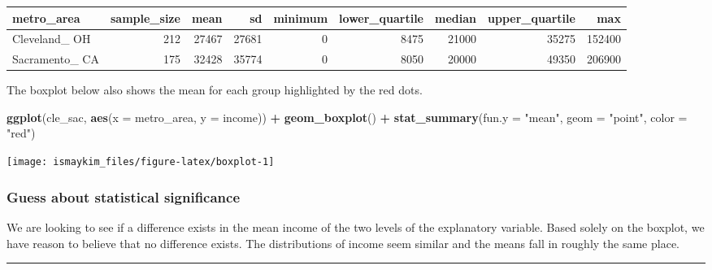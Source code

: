 \documentclass[12pt,]{krantz}
\makeatletter
\newenvironment{Shaded}{\begin{snugshade}}{\end{snugshade}}
\newcommand{\KeywordTok}[1]{\textcolor[rgb]{0.27,0.27,0.27}{\textbf{#1}}}
\newcommand{\DataTypeTok}[1]{\textcolor[rgb]{0.27,0.27,0.27}{#1}}
\newcommand{\StringTok}[1]{\textcolor[rgb]{0.5,0.5,0.5}{#1}}
\newcommand{\OperatorTok}[1]{\textcolor[rgb]{0.43,0.43,0.43}{\textbf{#1}}}
\newcommand{\NormalTok}[1]{#1}
\newenvironment{kframe}{%
\medskip{}
\setlength{\fboxsep}{.8em}
 \def\at@end@of@kframe{}%
 \ifinner\ifhmode%
  \def\at@end@of@kframe{\end{minipage}}%
  \begin{minipage}{\columnwidth}%
 \fi\fi%
 \def\FrameCommand##1{\hskip\@totalleftmargin \hskip-\fboxsep
 \colorbox{shadecolor}{##1}\hskip-\fboxsep
     \hskip-\linewidth \hskip-\@totalleftmargin \hskip\columnwidth}%
 \MakeFramed {\advance\hsize-\width
   \@totalleftmargin\z@ \linewidth\hsize
   \@setminipage}}%
 {\par\unskip\endMakeFramed%
 \at@end@of@kframe}
\renewenvironment{Shaded}{\begin{kframe}}{\end{kframe}}
\theoremstyle{definition}
\theoremstyle{definition}
\theoremstyle{definition}
\theoremstyle{remark}
\makeatother
\begin{document}
\begin{table}[H]
\centering\begingroup\fontsize{10}{12}\selectfont

\begin{tabular}{l|r|r|r|r|r|r|r|r}
\hline
metro\_area & sample\_size & mean & sd & minimum & lower\_quartile & median & upper\_quartile & max\\
\hline
Cleveland\_ OH & 212 & 27467 & 27681 & 0 & 8475 & 21000 & 35275 & 152400\\
\hline
Sacramento\_ CA & 175 & 32428 & 35774 & 0 & 8050 & 20000 & 49350 & 206900\\
\hline
\end{tabular}
\endgroup{}
\end{table}

The boxplot below also shows the mean for each group highlighted by the
red dots.

\begin{Shaded}
\begin{Highlighting}[]
\KeywordTok{ggplot}\NormalTok{(cle_sac, }\KeywordTok{aes}\NormalTok{(}\DataTypeTok{x =}\NormalTok{ metro_area, }\DataTypeTok{y =}\NormalTok{ income)) }\OperatorTok{+}
\StringTok{  }\KeywordTok{geom_boxplot}\NormalTok{() }\OperatorTok{+}
\StringTok{  }\KeywordTok{stat_summary}\NormalTok{(}\DataTypeTok{fun.y =} \StringTok{"mean"}\NormalTok{, }\DataTypeTok{geom =} \StringTok{"point"}\NormalTok{, }\DataTypeTok{color =} \StringTok{"red"}\NormalTok{)}
\end{Highlighting}
\end{Shaded}

\begin{center}\texttt{[image: ismaykim\_files/figure-latex/boxplot-1]} \end{center}

\subsubsection*{Guess about statistical
significance}\label{guess-about-statistical-significance-3}

We are looking to see if a difference exists in the mean income of the
two levels of the explanatory variable. Based solely on the boxplot, we
have reason to believe that no difference exists. The distributions of
income seem similar and the means fall in roughly the same place.

\begin{center}\rule{0.5\linewidth}{\linethickness}\end{center}
\end{document}
